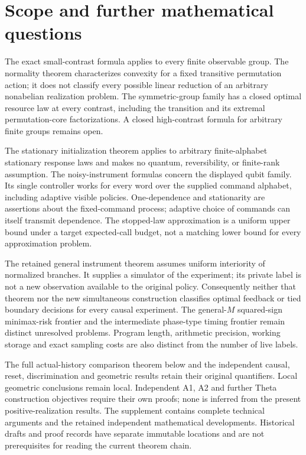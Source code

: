 \section{Scope and further mathematical questions}\label{sec:r73-scope}\label{sec:r74-scope}\label{sec:r75-scope}
The exact small-contrast formula applies to every finite observable group.
The normality theorem characterizes convexity for a fixed transitive
permutation action; it does not classify every possible linear reduction
of an arbitrary nonabelian realization problem. The symmetric-group family
has a closed optimal resource law at every contrast, including the
transition and its extremal permutation-core factorizations. A closed
high-contrast formula for arbitrary finite groups remains open.

The stationary initialization theorem applies to arbitrary finite-alphabet
stationary response laws and makes no quantum, reversibility, or finite-rank
assumption. The noisy-instrument formulas concern the displayed qubit
family. Its single controller works for every word over the supplied
command alphabet, including adaptive visible policies. One-dependence and
stationarity are assertions about the fixed-command process; adaptive
choice of commands can itself transmit dependence. The stopped-law
approximation is a uniform upper bound under a target expected-call budget,
not a matching lower bound for every approximation problem.

The retained general instrument theorem assumes uniform interiority of
normalized branches. It supplies a simulator of the experiment; its
private label is not a new observation available to the original policy.
Consequently neither that theorem nor the new simultaneous construction
classifies optimal feedback or tied boundary decisions for every causal
experiment. The general-$M$ squared-sign minimax-risk frontier and the
intermediate phase-type timing frontier remain distinct unresolved
problems. Program length, arithmetic precision, working storage and exact
sampling costs are also distinct from the number of live labels.

The full actual-history comparison theorem below and the independent
causal, reset, discrimination and geometric results retain their original
quantifiers. Local geometric conclusions remain local. Independent A1,
A2 and further Theta construction objectives require their own proofs;
none is inferred from the present positive-realization results. The
supplement contains complete technical arguments and the retained
independent mathematical developments. Historical drafts and proof
records have separate immutable locations and are not prerequisites for
reading the current theorem chain.



